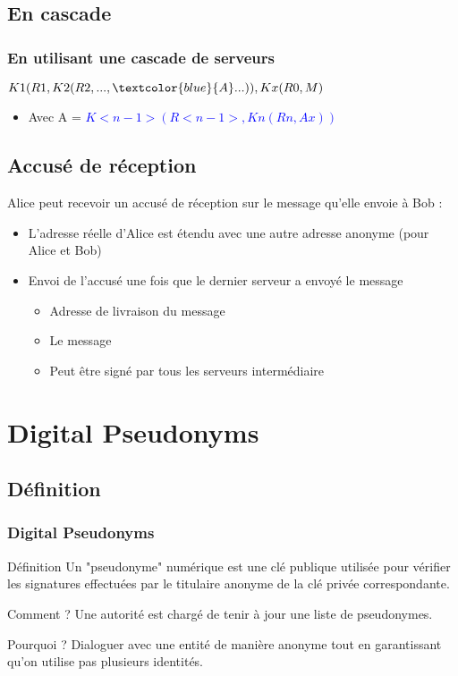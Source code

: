 \documentclass{beamer}
\begin{document}
\subsection{En cascade}
\begin{frame}
\frametitle{En utilisant une cascade de serveurs}
\begin{center}
$K1( R1, K2( R2, ..., \textcolor{blue}{A} ...)), Kx( R0, M )$
\end{center}
\begin{itemize}
[triangle]
\item Avec A = \textcolor{blue}{$K<n-1>( R<n-1>, Kn( Rn, Ax ))$}
\end{itemize}
\end{frame}

\subsection{Accusé de réception}
\begin{frame}
Alice peut recevoir un accusé de réception sur le message qu'elle envoie à Bob :
\begin{itemize}
[triangle]
\item L'adresse réelle d'Alice est étendu avec une autre adresse anonyme (pour Alice et Bob)
\pause
\item Envoi de l'accusé une fois que le dernier serveur a envoyé le message
\pause
	\begin{itemize}
	\item Adresse de livraison du message
	\item Le message
	\item Peut être signé par tous les serveurs intermédiaire
	\end{itemize}
\end{itemize}
\end{frame}

\section{Digital Pseudonyms}
\subsection{Définition}
\begin{frame}
\frametitle{Digital Pseudonyms}
\begin{block}{Définition}
Un "pseudonyme" numérique est une clé publique utilisée pour vérifier les signatures effectuées par le titulaire anonyme de la clé privée correspondante.
\end{block}
\pause
\begin{block}{Comment ?}
Une autorité est chargé de tenir à jour une liste de pseudonymes.
\end{block}
\pause
\begin{block}{Pourquoi ?}
Dialoguer avec une entité de manière anonyme tout en garantissant qu'on utilise pas plusieurs identités.
\end{block}
\end{frame}
\end{document}
